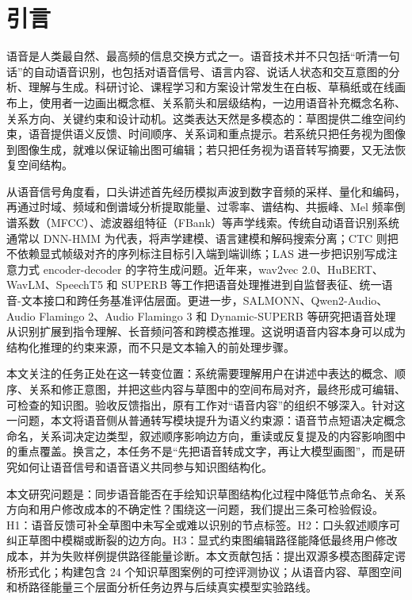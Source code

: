\documentclass[UTF8,a4paper,12pt,fontset=fandol]{ctexart}
\begin{document}
\section{引言}

语音是人类最自然、最高频的信息交换方式之一。语音技术并不只包括“听清一句话”的自动语音识别，也包括对语音信号、语言内容、说话人状态和交互意图的分析、理解与生成。科研讨论、课程学习和方案设计常发生在白板、草稿纸或在线画布上，使用者一边画出概念框、关系箭头和层级结构，一边用语音补充概念名称、关系方向、关键约束和设计动机。这类表达天然是多模态的：草图提供二维空间约束，语音提供语义反馈、时间顺序、关系词和重点提示。若系统只把任务视为图像到图像生成，就难以保证输出图可编辑；若只把任务视为语音转写摘要，又无法恢复空间结构。

从语音信号角度看，口头讲述首先经历模拟声波到数字音频的采样、量化和编码，再通过时域、频域和倒谱域分析提取能量、过零率、谱结构、共振峰、Mel 频率倒谱系数（MFCC）、滤波器组特征（FBank）等声学线索。传统自动语音识别系统通常以 DNN-HMM 为代表，将声学建模、语言建模和解码搜索分离；CTC 则把不依赖显式帧级对齐的序列标注目标引入端到端训练；LAS 进一步把识别写成注意力式 encoder-decoder 的字符生成问题\cite{hinton2012dnnhmm,graves2006ctc,chan2015las}。近年来，wav2vec 2.0、HuBERT、WavLM、SpeechT5 和 SUPERB 等工作把语音处理推进到自监督表征、统一语音-文本接口和跨任务基准评估层面\cite{baevski2020wav2vec2,hsu2021hubert,chen2022wavlm,ao2022speecht5,yang2021superb}。更进一步，SALMONN、Qwen2-Audio、Audio Flamingo 2、Audio Flamingo 3 和 Dynamic-SUPERB 等研究把语音处理从识别扩展到指令理解、长音频问答和跨模态推理\cite{tang2023salmonn,chu2024qwen2audio,ghosh2025audioflamingo2,goel2025audioflamingo3,huang2023dynamicsuperb}。这说明语音内容本身可以成为结构化推理的约束来源，而不只是文本输入的前处理步骤。

本文关注的任务正处在这一转变位置：系统需要理解用户在讲述中表达的概念、顺序、关系和修正意图，并把这些内容与草图中的空间布局对齐，最终形成可编辑、可检查的知识图。验收反馈指出，原有工作对“语音内容”的组织不够深入。针对这一问题，本文将语音侧从普通转写模块提升为语义约束源：语音节点短语决定概念命名，关系词决定边类型，叙述顺序影响边方向，重读或反复提及的内容影响图中的重点覆盖。换言之，本任务不是“先把语音转成文字，再让大模型画图”，而是研究如何让语音信号和语音语义共同参与知识图结构化。

本文研究问题是：同步语音能否在手绘知识草图结构化过程中降低节点命名、关系方向和用户修改成本的不确定性？围绕这一问题，我们提出三条可检验假设。H1：语音反馈可补全草图中未写全或难以识别的节点标签。H2：口头叙述顺序可纠正草图中模糊或断裂的边方向。H3：显式约束图编辑路径能降低最终用户修改成本，并为失败样例提供路径能量诊断。本文贡献包括：提出双源多模态图薛定谔桥形式化；构建包含 24 个知识草图案例的可控评测协议；从语音内容、草图空间和桥路径能量三个层面分析任务边界与后续真实模型实验路线。
\end{document}
